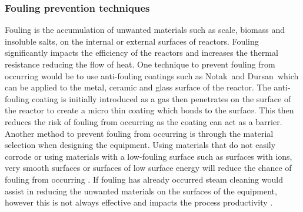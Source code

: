 \subsubsection{Fouling prevention techniques}
Fouling is the accumulation of unwanted materials such as scale, biomass and insoluble salts, on the internal or external surfaces of reactors. Fouling significantly impacts the efficiency of the reactors and increases the thermal resistance reducing the flow of heat. One technique to prevent fouling from occurring would be to use anti-fouling coatings such as Notak\texttrademark\ and Dursan\textsuperscript \textregistered\  which can be applied to the metal, ceramic and glass surface of the reactor. The anti-fouling coating is initially introduced as a gas then penetrates on the surface of the reactor to create a micro thin coating which bonds to the surface. This then reduces the risk of fouling from occurring as the coating can act as a barrier. Another method to prevent fouling from occurring is through the material selection when designing the equipment. Using materials that do not easily corrode or using materials with a low-fouling surface such as surfaces with ions, very smooth surfaces or surfaces of low surface energy will reduce the chance of fouling from occurring \cite{Ibrahim12}. If fouling has already occurred steam cleaning would assist in reducing the unwanted materials on the surfaces of the equipment, however this is not always effective and impacts the process productivity \cite{KillcrossMartin2012CPT}.